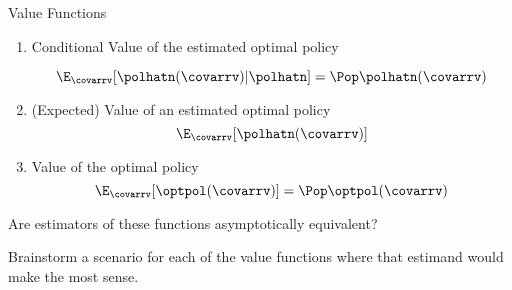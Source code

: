 \documentclass[aspectratio=169, professionalfonts]{beamer}
\begin{document}
\begin{frame}{Value Functions}
	\begin{enumerate}
		\item Conditional Value of the estimated optimal policy

		      $$\E_{\covarrv}[\polhatn(\covarrv) \vert \polhatn] = \Pop \polhatn(\covarrv)$$

		\item (Expected) Value of an estimated optimal policy
		      $$\E_{\covarrv}[\polhatn(\covarrv)]$$

		\item Value of the optimal policy
		      $$\E_{\covarrv}[\optpol(\covarrv)] = \Pop \optpol(\covarrv)$$
	\end{enumerate}

	\vfill \pause

	Are estimators of these functions asymptotically equivalent?

	\vfill \pause
	Brainstorm a scenario for each of the value functions where that estimand would
	make the most sense.
\end{frame}
\end{document}
